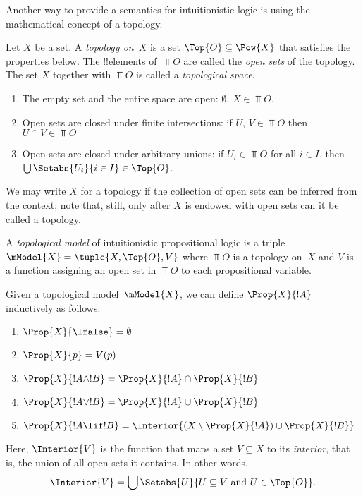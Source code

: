 \documentclass[../../../include/open-logic-section]{subfiles}
\begin{document}

Another way to provide a semantics for intuitionistic logic is using
the mathematical concept of a topology.

\begin{defn}
  Let $X$ be a set. A \emph{topology on~$X$} is a set $\Top{O}
  \subseteq \Pow{X}$ that satisfies the properties below. The
  !!{element}s of~$\Top{O}$ are called the \emph{open sets} of the
  topology. The set $X$ together with $\Top{O}$ is called a
  \emph{topological space}.
  \begin{enumerate}
  \item The empty set and the entire space are open: $\emptyset$, $X \in
    \Top{O}$.
  \item Open sets are closed under finite intersections: if $U$, $V \in
    \Top{O}$ then $U \cap V \in \Top{O}$
  \item Open sets are closed under arbitrary unions: if $U_i \in
    \Top{O}$ for all $i \in I$, then $\bigcup \Setabs{U_i}{i \in
      I} \in \Top{O}$.
  \end{enumerate}
\end{defn}

We may write $X$ for a topology if the collection of open sets can be
inferred from the context; note that, still, only after $X$ is endowed
with open sets can it be called a topology.

\begin{defn}
  A \emph{topological model} of intuitionistic propositional logic is
  a triple $\mModel{X} = \tuple{X, \Top{O}, V}$ where $\Top{O}$ is a
  topology on~$X$ and $V$ is a function assigning an open set in
  $\Top{O}$ to each propositional variable.

  Given a topological model~$\mModel{X}$, we can define $\Prop{X}{!A}$
  inductively as follows:
  \begin{enumerate}
  \item $\Prop{X}{\lfalse} = \emptyset$
  \item $\Prop{X}{p} = V(p)$
  \item $\Prop{X}{!A \land !B} = \Prop{X}{!A} \cap \Prop{X}{!B}$
  \item $\Prop{X}{!A \lor !B} = \Prop{X}{!A} \cup \Prop{X}{!B}$
  \item $\Prop{X}{!A \lif !B} = \Interior{(X \setminus \Prop{X}{!A}) \cup
    \Prop{X}{!B}}$
  \end{enumerate}
  Here, $\Interior{V}$ is the function that maps a set $V \subseteq X$
  to its \emph{interior}, that is, the union of all open sets it
  contains. In other words,
  \[
  \Interior{V} = \bigcup \Setabs{U}{U \subseteq V \text{ and } U \in \Top{O}}.
  \]
\end{defn}
\end{document}
